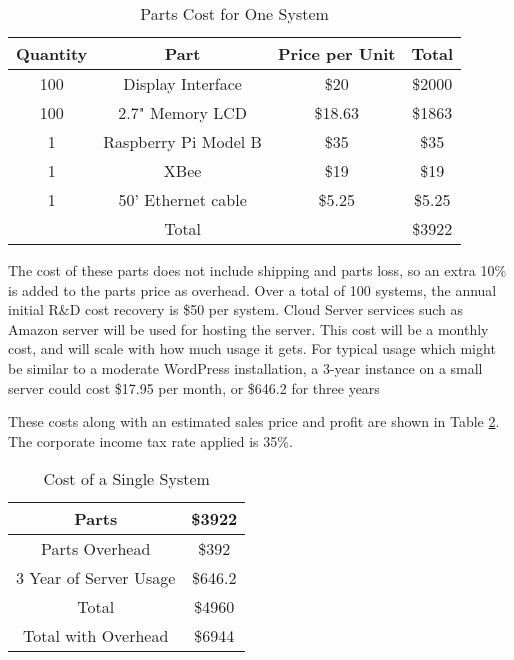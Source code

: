 \documentclass[PPFS.tex]{template/subfiles}
\begin{document}
        \begin{table}[H]
        	\begin{center}
        		\caption{Parts Cost for One System}
        		\label{tab:prodPartsCost}
        		\begin{tabular}{|c|c|c|c|}
        			\hline
        			Quantity & Part & Price per Unit & Total\\
        			\hline
        			100 & Display Interface & \$20 & \$2000\\
        			\hline
        			100 & 2.7" Memory LCD & \$18.63 \cite{mouserMemoryLCD} & \$1863\\
        			\hline
        			1 & Raspberry Pi Model B & \$35 \cite{alliedRaspberryPi} & \$35\\
        			\hline
        			1 & XBee & \$19 \cite{mouserXBEE} & \$19\\
        			\hline
        			1 & 50' Ethernet cable & \$5.25 \cite{amazonEthernetCable} & \$5.25\\
        			\hline
        			&Total&& \$3922\\
        			\hline
        		\end{tabular}
        	\end{center}
        \end{table}
        
        The cost of these parts does not include shipping and parts loss, so an extra 10\% is added to the parts price as overhead. 
        Over a total of 100 systems, the annual initial R\&D cost recovery is \$50 per system.
        Cloud Server services such as Amazon server will be used for hosting the server. This cost will be a monthly cost, and will scale with how much usage it gets. For typical usage which might be similar to a moderate WordPress installation, a 3-year instance on a small server could cost \$17.95 per month, or \$646.2 for three years \cite{wordPressEstimate}
        
        These costs along with an estimated sales price and profit are shown in Table \ref{tab:prodTotalCosts}. The corporate income tax rate applied is 35\%.
        
        \begin{table}[H]
        	\begin{center}
        		\caption{Cost of a Single System}
        		\label{tab:prodTotalCosts}
        		\begin{tabular}{|c|c|}
        			\hline
        			Parts & \$3922\\
        			\hline
        			Parts Overhead & \$392\\
        			\hline
        			3 Year of Server Usage & \$646.2\\
        			\hline
        			Total & \$4960\\
        			\hline
        			Total with Overhead & \$6944\\
        			\hline
        		\end{tabular}
        	\end{center}
        \end{table}
        
\end{document}
